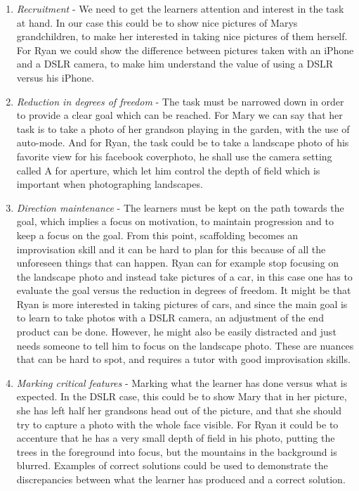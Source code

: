 \begin{enumerate}
\item{} \emph{Recruitment} - We need to get the learners attention and interest in the task at hand. In our case this could be to show nice pictures of Marys grandchildren, to make her interested in taking nice pictures of them herself. For Ryan we could show the difference between pictures taken with an iPhone and a DSLR camera, to make him understand the value of using a DSLR versus his iPhone.
\item{} \emph{Reduction in degrees of freedom} - The task must be narrowed down in order to provide a clear goal which can be reached. For Mary we can say that her task is to take a photo of her grandson playing in the garden, with the use of auto-mode. And for Ryan, the task could be to take a landscape photo of his favorite view for his facebook coverphoto, he shall use the camera setting called A for aperture, which let him control the depth of field which is important when photographing landscapes. 
\item{} \emph{Direction maintenance} - The learners must be kept on the path towards the goal, which implies a focus on motivation, to maintain progression and to keep a focus on the goal. From this point, scaffolding becomes an improvisation skill and it can be hard to plan for this because of all the unforeseen things that can happen. Ryan can for example stop focusing on the landscape photo and instead take pictures of a car, in this case one has to evaluate the goal versus the reduction in degrees of freedom. It might be that Ryan is more interested in taking pictures of cars, and since the main goal is to learn to take photos with a DSLR camera, an adjustment of the end product can be done. However, he might also be easily distracted and just needs someone to tell him to focus on the landscape photo. These are nuances that can be hard to spot, and requires a tutor with good improvisation skills.
\item{} \emph{Marking critical features} - Marking what the learner has done versus what is expected. In the DSLR case, this could be to show Mary that in her picture, she has left half her grandsons head out of the picture, and that she should try to capture a photo with the whole face visible. For Ryan it could be to accenture that he has a very small depth of field in his photo, putting the trees in the foreground into focus, but the mountains in the background is blurred. Examples of correct solutions could be used to demonstrate the discrepancies between what the learner has produced and a correct solution.

\end{enumerate}
